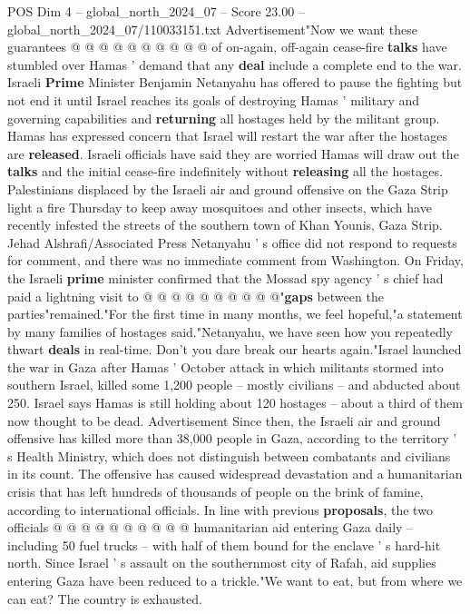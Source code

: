 \begin{textsample}{POS Dim 4 – global\_north\_2024\_07 – Score 23.00 – global\_north\_2024\_07/110033151.txt}
Advertisement"Now we want these guarantees @ @ @ @ @ @ @ @ @ @ of on-again, off-again cease-fire \textbf{talks} have stumbled over Hamas ' demand that any \textbf{deal} include a complete end to the war.
Israeli \textbf{Prime} Minister Benjamin Netanyahu has offered to pause the fighting but not end it until Israel reaches its goals of destroying Hamas ' military and governing capabilities and \textbf{returning} all hostages held by the militant group.
Hamas has expressed concern that Israel will restart the war after the hostages are \textbf{released}.
Israeli officials have said they are worried Hamas will draw out the \textbf{talks} and the initial cease-fire indefinitely without \textbf{releasing} all the hostages.
Palestinians displaced by the Israeli air and ground offensive on the Gaza Strip light a fire Thursday to keep away mosquitoes and other insects, which have recently infested the streets of the southern town of Khan Younis, Gaza Strip.
Jehad Alshrafi/Associated Press Netanyahu ' s office did not respond to requests for comment, and there was no immediate comment from Washington.
On Friday, the Israeli \textbf{prime} minister confirmed that the Mossad spy agency ' s chief had paid a lightning visit to @ @ @ @ @ @ @ @ @ @"\textbf{gaps} between the parties"remained."For the first time in many months, we feel hopeful,"a statement by many families of hostages said."Netanyahu, we have seen how you repeatedly thwart \textbf{deals} in real-time.
Don't you dare break our hearts again."Israel launched the war in Gaza after Hamas ' October attack in which militants stormed into southern Israel, killed some 1,200 people -- mostly civilians -- and abducted about 250.
Israel says Hamas is still holding about 120 hostages -- about a third of them now thought to be dead.
Advertisement Since then, the Israeli air and ground offensive has killed more than 38,000 people in Gaza, according to the territory ' s Health Ministry, which does not distinguish between combatants and civilians in its count.
The offensive has caused widespread devastation and a humanitarian crisis that has left hundreds of thousands of people on the brink of famine, according to international officials.
In line with previous \textbf{proposals}, the two officials @ @ @ @ @ @ @ @ @ @ humanitarian aid entering Gaza daily -- including 50 fuel trucks -- with half of them bound for the enclave ' s hard-hit north.
Since Israel ' s assault on the southernmost city of Rafah, aid supplies entering Gaza have been reduced to a trickle."We want to eat, but from where we can eat?
The country is exhausted.

\end{textsample}
